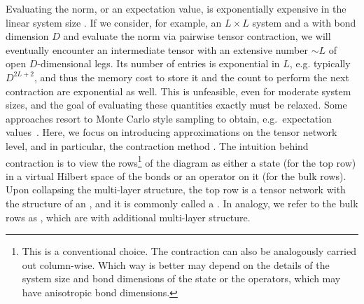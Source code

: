 Evaluating the norm, or an expectation value, is exponentially expensive in the linear system size \cite{schuch2007}.
%
If we consider, for example, an $L \times L$ system and a  with bond dimension $D$ and evaluate the norm via pairwise tensor contraction, we will eventually encounter an intermediate tensor with an extensive number $\sim L$ of open $D$-dimensional legs.
%
Its number of entries is exponential in $L$, e.g. typically $D^{2L + 2}$, and thus the memory cost to store it and the  count to perform the next contraction are exponential as well.
%
This is unfeasible, even for moderate system sizes, and the goal of evaluating these quantities exactly must be relaxed.
%
Some approaches resort to Monte Carlo style sampling to obtain, e.g.~expectation values~\cite{wang2011, schuch2008a}.
%
Here, we focus on introducing approximations on the tensor network level, and in particular, the  contraction method \cite{verstraete2004, lubasch2014, lubasch2014a}.
%
The intuition behind  contraction is to view the rows\footnote{
    This is a conventional choice. The contraction can also be analogously carried out column-wise.
    Which way is better may depend on the details of the system size and bond dimensions of the state or the operators, which may have anisotropic bond dimensions.
}
of the diagram as either a state (for the top row) in a virtual Hilbert space of the  bonds or an operator on it (for the bulk rows).
%
Upon collapsing the multi-layer structure, the top row is a tensor network with the structure of an , and it is commonly called a .
%
In analogy, we refer to the bulk rows as , which are  with additional multi-layer structure.
%

